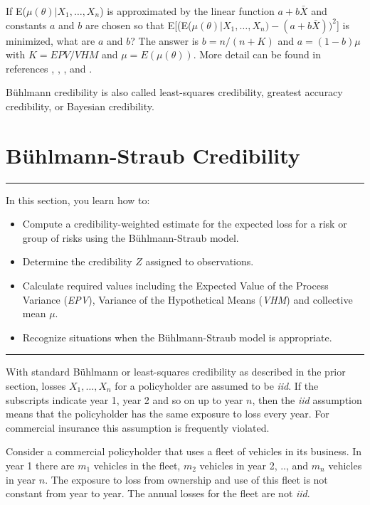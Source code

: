 \documentclass[]{book}
\providecommand{\tightlist}{%
  \setlength{\itemsep}{0pt}\setlength{\parskip}{0pt}}
\theoremstyle{definition}
\theoremstyle{definition}
\theoremstyle{definition}
\theoremstyle{remark}
\begin{document}
If E(\(\mu(\theta)|X_1,\ldots,X_n\)) is approximated by the linear
function \(a+b\bar{X}\) and constants \(a\) and \(b\) are chosen so that
E{[}(E(\(\mu(\theta)|X_1,\ldots,X_n)-(a+b\bar{X}))^2\){]} is minimized,
what are \(a\) and \(b\)? The answer is \(b=n/(n+K)\) and \(a=(1-b)\mu\)
with \(K=EPV/VHM\) and \(\mu=E(\mu(\theta))\). More detail can be found
in references \citep{buhlmann}, \citep{buhlmanngisler},
\citep{klugman2012}, and \citep{tse}.

Bühlmann credibility is also called least-squares credibility, greatest
accuracy credibility, or Bayesian credibility.

\section{Bühlmann-Straub Credibility}\label{buhlmann-straub-credibility}

\begin{center}\rule{0.5\linewidth}{\linethickness}\end{center}

In this section, you learn how to:

\begin{itemize}
\tightlist
\item
  Compute a credibility-weighted estimate for the expected loss for a
  risk or group of risks using the Bühlmann-Straub model.
\item
  Determine the credibility \(Z\) assigned to observations.
\item
  Calculate required values including the Expected Value of the Process
  Variance (\emph{EPV}), Variance of the Hypothetical Means (\emph{VHM})
  and collective mean \(\mu\).
\item
  Recognize situations when the Bühlmann-Straub model is appropriate.
\end{itemize}

\begin{center}\rule{0.5\linewidth}{\linethickness}\end{center}

With standard Bühlmann or least-squares credibility as described in the
prior section, losses \(X_1,\ldots,X_n\) for a policyholder are assumed
to be \emph{iid}. If the subscripts indicate year 1, year 2 and so on up
to year \(n\), then the \emph{iid} assumption means that the
policyholder has the same exposure to loss every year. For commercial
insurance this assumption is frequently violated.

Consider a commercial policyholder that uses a fleet of vehicles in its
business. In year 1 there are \(m_1\) vehicles in the fleet, \(m_2\)
vehicles in year 2, .., and \(m_n\) vehicles in year \(n\). The exposure
to loss from ownership and use of this fleet is not constant from year
to year. The annual losses for the fleet are not \emph{iid}.
\end{document}
